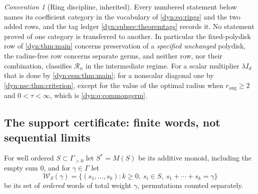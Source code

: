 \documentclass[11pt,letterpaper]{article}
\theoremstyle{definition}
\theoremstyle{remark}
\newtheorem{convention}[convention]{Convention}
\newcommand{\word}{\mathcal W}
\newcommand{\rang}{r_{\mathrm{ang}}}
\numberwithin{equation}{section}
\begin{document}
\begin{convention}[Ring discipline, inherited]\label{dyn:conv:rings}
Every numbered statement below names its coefficient category in the
vocabulary of \eqref{dyn:eq:rings} and the two added rows, and the tag
ledger \cref{dyn:subsec:theoremtags} records it. No statement proved of one
category is transferred to another. In particular the fixed-polydisk row
of \cref{dyn:thm:main} concerns preservation of a \emph{specified
unchanged} polydisk, the radius-free row concerns separate germs, and
neither row, nor their combination, classifies $\mathcal R_n$ in the
intermediate regime. For a scalar multiplier $\lambda I_d$ that is done by
\cref{dyn:esm:thm:main}; for a nonscalar diagonal one by
\cref{dyn:nsc:thm:criterion}, except for the value of the optimal radius
when $\rang\ge2$ and $0<\tau<\infty$, which is \cref{dyn:q:commongerm}.
\end{convention}

\subsection{The support certificate: finite words, not sequential limits}
\label{dyn:sec:support}

For well ordered $S\subset\Gamma_{>0}$ let $S^{*}=M(S)$ be its additive
monoid, including the empty sum $0$, and for $\gamma\in\Gamma$ let
\[
 \word_S(\gamma)=\{(s_1,\dots,s_k):k\ge0,\ s_i\in S,\
 s_1+\cdots+s_k=\gamma\}
\]
be its set of \emph{ordered} words of total weight $\gamma$, permutations
counted separately.
\end{document}
